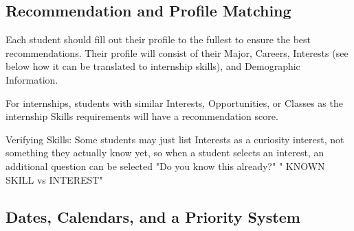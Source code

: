 \documentclass[english]{proposalnsf}
\begin{document}
		\subsection{Recommendation and Profile Matching}
		Each student should fill out their profile to the fullest to ensure the best recommendations. Their profile will consist of their Major, Careers, Interests (see below how it can be translated to internship skills), and Demographic Information. 
		
		For internships, students with similar Interests, Opportunities, or Classes as the internship Skills requirements will have a recommendation score.
		
		Verifying Skills:
		Some students may just list Interests as a curiosity interest, not something they actually know yet, so when a student selects an interest, an additional question can be selected "Do you know this already?" " KNOWN SKILL vs INTEREST"
		
		
		
		\subsection{Dates, Calendars, and a Priority System}
		
	
\end{document}
